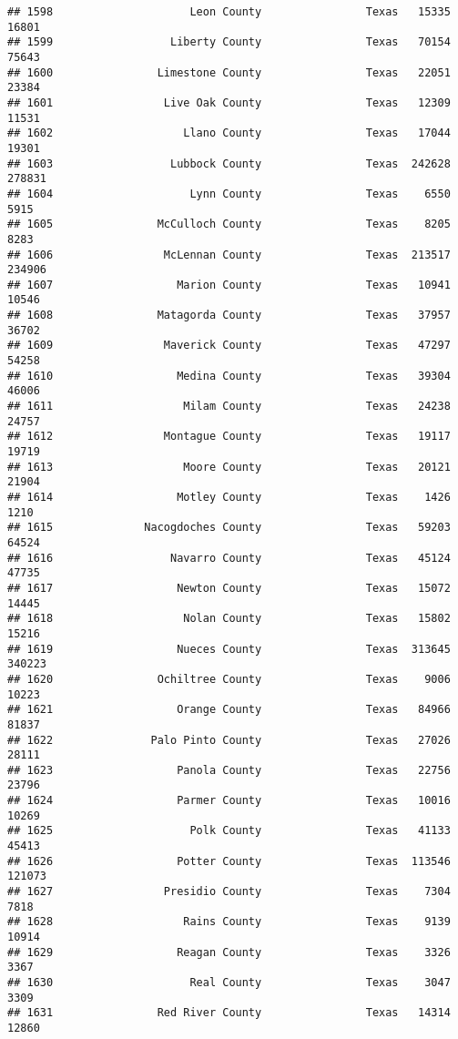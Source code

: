 \documentclass[
]{article}
\begin{document}
\begin{verbatim}
## 1598                     Leon County                Texas   15335   16801
## 1599                  Liberty County                Texas   70154   75643
## 1600                Limestone County                Texas   22051   23384
## 1601                 Live Oak County                Texas   12309   11531
## 1602                    Llano County                Texas   17044   19301
## 1603                  Lubbock County                Texas  242628  278831
## 1604                     Lynn County                Texas    6550    5915
## 1605                McCulloch County                Texas    8205    8283
## 1606                 McLennan County                Texas  213517  234906
## 1607                   Marion County                Texas   10941   10546
## 1608                Matagorda County                Texas   37957   36702
## 1609                 Maverick County                Texas   47297   54258
## 1610                   Medina County                Texas   39304   46006
## 1611                    Milam County                Texas   24238   24757
## 1612                 Montague County                Texas   19117   19719
## 1613                    Moore County                Texas   20121   21904
## 1614                   Motley County                Texas    1426    1210
## 1615              Nacogdoches County                Texas   59203   64524
## 1616                  Navarro County                Texas   45124   47735
## 1617                   Newton County                Texas   15072   14445
## 1618                    Nolan County                Texas   15802   15216
## 1619                   Nueces County                Texas  313645  340223
## 1620                Ochiltree County                Texas    9006   10223
## 1621                   Orange County                Texas   84966   81837
## 1622               Palo Pinto County                Texas   27026   28111
## 1623                   Panola County                Texas   22756   23796
## 1624                   Parmer County                Texas   10016   10269
## 1625                     Polk County                Texas   41133   45413
## 1626                   Potter County                Texas  113546  121073
## 1627                 Presidio County                Texas    7304    7818
## 1628                    Rains County                Texas    9139   10914
## 1629                   Reagan County                Texas    3326    3367
## 1630                     Real County                Texas    3047    3309
## 1631                Red River County                Texas   14314   12860

\end{verbatim}
\end{document}
